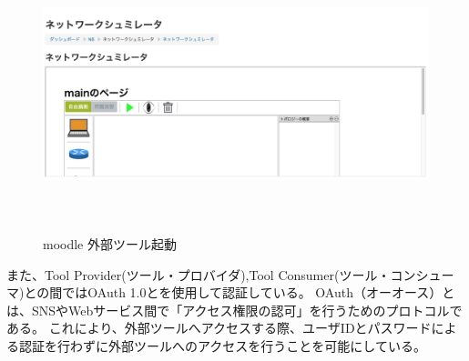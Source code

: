 \begin{figure}[htbp]
  \begin{center}
    \includegraphics[clip,width=12.0cm,height=8.0cm]{img/LTI起動画面.png}
    \caption{moodle 外部ツール起動}
    \label{fig:moodle kidou}
  \end{center}
\end{figure}








また、Tool Provider(ツール・プロバイダ),Tool Consumer(ツール・コンシューマ)との間ではOAuth 1.0とを使用して認証している。
OAuth（オーオース）とは、SNSやWebサービス間で「アクセス権限の認可」を行うためのプロトコルである。
これにより、外部ツールへアクセスする際、ユーザIDとパスワードによる認証を行わずに外部ツールへのアクセスを行うことを可能にしている。
